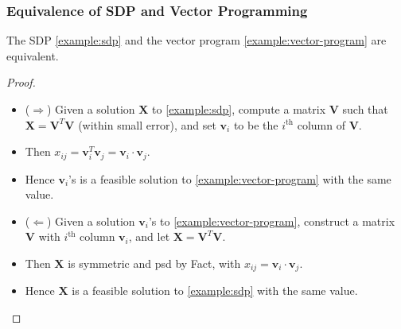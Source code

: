 \documentclass{beamer}
\begin{document}
    \begin{frame}
        \frametitle{Equivalence of SDP and Vector Programming}
    
        \begin{theorem}
            The SDP \eqref{example:sdp} and the vector program \eqref{example:vector-program} are equivalent.
        \end{theorem}

        \pause

        \begin{proof}
            \begin{itemize}
                \item ($\Longrightarrow$) Given a solution $\mathbf X$ to \eqref{example:sdp}, compute a matrix $\mathbf V$ such that $\mathbf X = \mathbf V^T \mathbf V$ (within small error), and set $\mathbf v_i$ to be the $i^\text{th}$ column of $\mathbf V$. \pause
                \item Then $x_{ij} = \mathbf v_i^T \mathbf v_j = \mathbf v_i \cdot \mathbf v_j$. \pause
                \item Hence $\mathbf v_i$'s is a feasible solution to \eqref{example:vector-program} with the same value. \pause
                \item ($\Longleftarrow$) Given a solution $\mathbf v_i$'s to \eqref{example:vector-program}, construct a matrix $\mathbf V$ with $i^\text{th}$ column $\mathbf v_i$, and let $\mathbf X = \mathbf V^T \mathbf V$. \pause
                \item Then $\mathbf X$ is symmetric and psd by Fact, with $x_{ij} = \mathbf v_i \cdot \mathbf v_j$. \pause
                \item Hence $\mathbf X$ is a feasible solution to \eqref{example:sdp} with the same value.
            \end{itemize}
        \end{proof}
    \end{frame}
\end{document}
